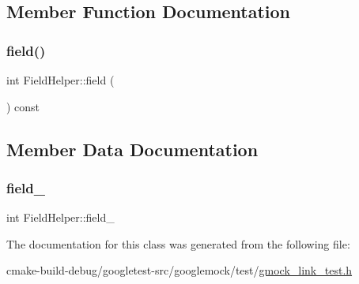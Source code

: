\subsection{Member Function Documentation}
\mbox{\label{classFieldHelper_af2959e142813205aeeb4d2ad27430ad3}} 
\subsubsection{\texorpdfstring{field()}{field()}}
{\footnotesize\ttfamily int Field\+Helper\+::field (\begin{DoxyParamCaption}{ }\end{DoxyParamCaption}) const\hspace{0.3cm}{\ttfamily [inline]}}



\subsection{Member Data Documentation}
\mbox{\label{classFieldHelper_a50a7ec9efc60377363d5ce8bea1708ac}} 
\subsubsection{\texorpdfstring{field\_}{field\_}}
{\footnotesize\ttfamily int Field\+Helper\+::field\+\_\+}



The documentation for this class was generated from the following file\+:\begin{DoxyCompactItemize}
\item 
cmake-\/build-\/debug/googletest-\/src/googlemock/test/\mbox{\hyperlink{gmock__link__test_8h}{gmock\+\_\+link\+\_\+test.\+h}}\end{DoxyCompactItemize}
